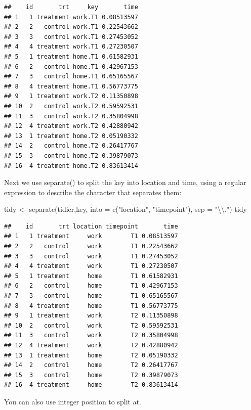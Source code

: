 \documentclass[
]{book}
\newenvironment{Shaded}{\begin{snugshade}}{\end{snugshade}}
\newcommand{\AttributeTok}[1]{\textcolor[rgb]{0.77,0.63,0.00}{#1}}
\newcommand{\FunctionTok}[1]{\textcolor[rgb]{0.00,0.00,0.00}{#1}}
\newcommand{\NormalTok}[1]{#1}
\newcommand{\OtherTok}[1]{\textcolor[rgb]{0.56,0.35,0.01}{#1}}
\newcommand{\SpecialCharTok}[1]{\textcolor[rgb]{0.00,0.00,0.00}{#1}}
\newcommand{\StringTok}[1]{\textcolor[rgb]{0.31,0.60,0.02}{#1}}
\begin{document}
\begin{verbatim}
##    id       trt     key       time
## 1   1 treatment work.T1 0.08513597
## 2   2   control work.T1 0.22543662
## 3   3   control work.T1 0.27453052
## 4   4 treatment work.T1 0.27230507
## 5   1 treatment home.T1 0.61582931
## 6   2   control home.T1 0.42967153
## 7   3   control home.T1 0.65165567
## 8   4 treatment home.T1 0.56773775
## 9   1 treatment work.T2 0.11350898
## 10  2   control work.T2 0.59592531
## 11  3   control work.T2 0.35804998
## 12  4 treatment work.T2 0.42880942
## 13  1 treatment home.T2 0.05190332
## 14  2   control home.T2 0.26417767
## 15  3   control home.T2 0.39879073
## 16  4 treatment home.T2 0.83613414
\end{verbatim}

Next we use separate() to split the key into location and time, using a regular expression to describe the character that separates them:

\begin{Shaded}
\begin{Highlighting}[]
\NormalTok{tidy }\OtherTok{\textless{}{-}} \FunctionTok{separate}\NormalTok{(tidier,key, }\AttributeTok{into =} \FunctionTok{c}\NormalTok{(}\StringTok{"location"}\NormalTok{, }\StringTok{"timepoint"}\NormalTok{), }\AttributeTok{sep =} \StringTok{"}\SpecialCharTok{\textbackslash{}\textbackslash{}}\StringTok{."}\NormalTok{)}
\NormalTok{tidy}
\end{Highlighting}
\end{Shaded}

\begin{verbatim}
##    id       trt location timepoint       time
## 1   1 treatment     work        T1 0.08513597
## 2   2   control     work        T1 0.22543662
## 3   3   control     work        T1 0.27453052
## 4   4 treatment     work        T1 0.27230507
## 5   1 treatment     home        T1 0.61582931
## 6   2   control     home        T1 0.42967153
## 7   3   control     home        T1 0.65165567
## 8   4 treatment     home        T1 0.56773775
## 9   1 treatment     work        T2 0.11350898
## 10  2   control     work        T2 0.59592531
## 11  3   control     work        T2 0.35804998
## 12  4 treatment     work        T2 0.42880942
## 13  1 treatment     home        T2 0.05190332
## 14  2   control     home        T2 0.26417767
## 15  3   control     home        T2 0.39879073
## 16  4 treatment     home        T2 0.83613414
\end{verbatim}

You can also use integer position to split at.
\end{document}
